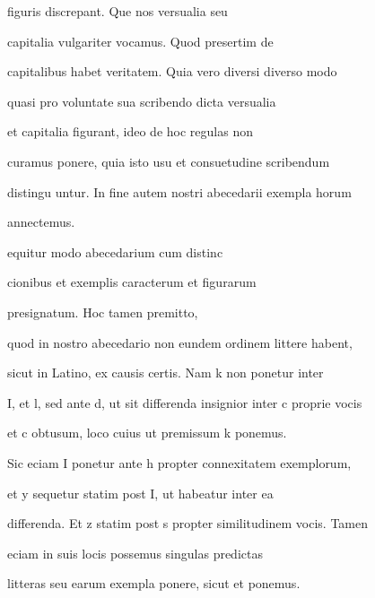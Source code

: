 figuris discrepant. Que nos versualia seu

capitalia vulgariter vocamus. Quod presertim de

capitalibus habet veritatem. Quia vero diversi diverso modo

quasi pro voluntate sua scribendo dicta versualia

et capitalia figurant, ideo de hoc regulas non

curamus ponere, quia isto usu et consuetudine scribendum

distingu untur. In fine autem nostri abecedarii exempla horum

annectemus.

\indentP {}equitur modo abecedarium cum distinc

cionibus et exemplis caracterum et figurarum

presignatum. Hoc tamen premitto,

quod in nostro abecedario non eundem ordinem littere habent,

sicut in Latino, ex causis certis. Nam k non ponetur inter

I, et l, sed ante d, ut sit differenda insignior inter c proprie vocis

et c obtusum, loco cuius ut premissum k ponemus.

Sic eciam I ponetur ante h propter connexitatem exemplorum,

et y sequetur statim post I, ut habeatur inter ea 

 differenda. Et z statim post s propter similitudinem vocis. Tamen

eciam in suis locis possemus singulas predictas

\newpage






\fullpreviouslines


{
\color{blue}

litteras seu earum exempla ponere, sicut et
ponemus.


}




\endinput








\catcode `\^^M=5

  \newtip{48}{Łoś niesłusznie uważa, że \textit{bika} w obu wypadkach
    napisano błędnie zamiast \textit{ƀyka}. Przykłady są bowiem podane
    w~pisowni dotychczasowej dla pokazania jej niewystarczalności do
    zróżnicowania wyrazów \textit{bika} i \textit{byka}.}

